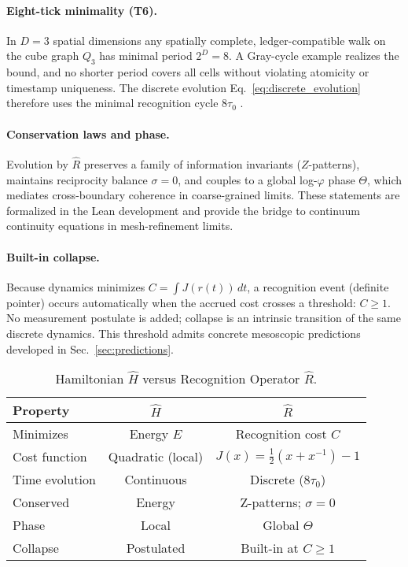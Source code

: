 \documentclass[aps,prx,twocolumn,superscriptaddress,nofootinbib]{revtex4-2}
\newcommand{\Rhat}{\hat{R}}
\newcommand{\Hhat}{\hat{H}}
\newcommand{\Jcost}{J}
\newcommand{\Ccost}{C}
\newcommand{\TauZero}{\tau_{0}}
\newcommand{\ThetaPhase}{\Theta}
\begin{document}
\paragraph*{Eight-tick minimality (T6).} In \(D=3\) spatial dimensions any spatially complete, ledger-compatible walk on the cube graph \(Q_3\) has minimal period \(2^D=8\). A Gray-cycle example realizes the bound, and no shorter period covers all cells without violating atomicity or timestamp uniqueness. The discrete evolution Eq.~\eqref{eq:discrete_evolution} therefore uses the minimal recognition cycle \(8\TauZero\) \cite{Tautology-to-Cosmos}.

\paragraph*{Conservation laws and phase.} Evolution by \(\Rhat\) preserves a family of information invariants (\(Z\)-patterns), maintains reciprocity balance \(\sigma=0\), and couples to a global log-\(\varphi\) phase \(\ThetaPhase\), which mediates cross-boundary coherence in coarse-grained limits. These statements are formalized in the Lean development and provide the bridge to continuum continuity equations in mesh-refinement limits.

\paragraph*{Built-in collapse.} Because dynamics minimizes \(\Ccost=\int \Jcost(r(t))\,dt\), a recognition event (definite pointer) occurs automatically when the accrued cost crosses a threshold: \(\Ccost\ge 1\). No measurement postulate is added; collapse is an intrinsic transition of the same discrete dynamics. This threshold admits concrete mesoscopic predictions developed in Sec.~\ref{sec:predictions}.

\begin{table}[t]
  \caption{Hamiltonian \(\Hhat\) versus Recognition Operator \(\Rhat\).}
  \label{tab:compare}
  \centering
  \begin{tabular}{lcc}
    \hline
    Property & \(\Hhat\) & \(\Rhat\) \\
    \hline
    Minimizes & Energy \(E\) & Recognition cost \(\Ccost\) \\
    Cost function & Quadratic (local) & \(\Jcost(x)=\tfrac12(x+x^{-1})-1\) \\
    Time evolution & Continuous & Discrete (\(8\TauZero\)) \\
    Conserved & Energy & Z-patterns; \(\sigma=0\) \\
    Phase & Local & Global \(\ThetaPhase\) \\
    Collapse & Postulated & Built-in at \(\Ccost\ge 1\) \\
    \hline
  \end{tabular}
\end{table}
\end{document}
